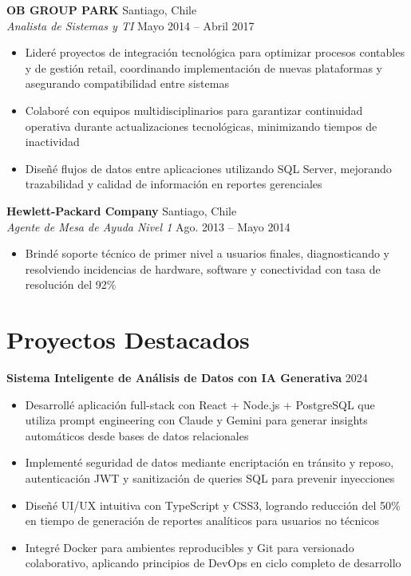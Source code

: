 \documentclass[11pt,letterpaper]{article}
\begin{document}
\vspace{2pt}
\textbf{OB GROUP PARK} \hfill Santiago, Chile\\
\textit{Analista de Sistemas y TI} \hfill Mayo 2014 – Abril 2017
\begin{itemize}
  \item Lideré proyectos de integración tecnológica para optimizar procesos contables y de gestión retail, coordinando implementación de nuevas plataformas y asegurando compatibilidad entre sistemas
  \item Colaboré con equipos multidisciplinarios para garantizar continuidad operativa durante actualizaciones tecnológicas, minimizando tiempos de inactividad
  \item Diseñé flujos de datos entre aplicaciones utilizando SQL Server, mejorando trazabilidad y calidad de información en reportes gerenciales
\end{itemize}
\vspace{2pt}
\textbf{Hewlett-Packard Company} \hfill Santiago, Chile\\
\textit{Agente de Mesa de Ayuda Nivel 1} \hfill Ago. 2013 – Mayo 2014
\begin{itemize}
  \item Brindé soporte técnico de primer nivel a usuarios finales, diagnosticando y resolviendo incidencias de hardware, software y conectividad con tasa de resolución del 92\%
\end{itemize}

\section{Proyectos Destacados}

\textbf{Sistema Inteligente de Análisis de Datos con IA Generativa} \hfill 2024
\begin{itemize}
  \item Desarrollé aplicación full-stack con React + Node.js + PostgreSQL que utiliza prompt engineering con Claude y Gemini para generar insights automáticos desde bases de datos relacionales
  \item Implementé seguridad de datos mediante encriptación en tránsito y reposo, autenticación JWT y sanitización de queries SQL para prevenir inyecciones
  \item Diseñé UI/UX intuitiva con TypeScript y CSS3, logrando reducción del 50\% en tiempo de generación de reportes analíticos para usuarios no técnicos
  \item Integré Docker para ambientes reproducibles y Git para versionado colaborativo, aplicando principios de DevOps en ciclo completo de desarrollo
\end{itemize}
\end{document}
